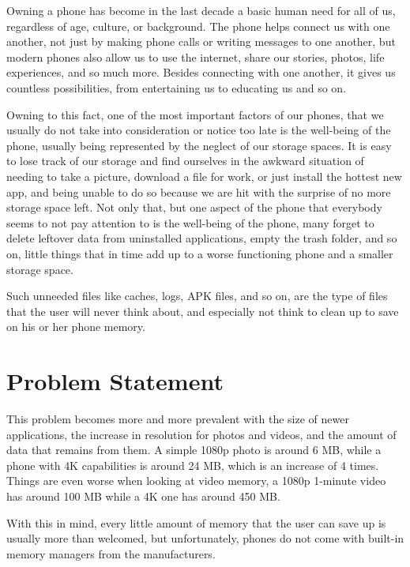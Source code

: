 Owning a phone has become in the last decade a basic human need for all of us, regardless of age, culture, or background. The phone helps connect us with one another, not just by making phone calls or writing messages to one another, but modern phones also allow us to use the internet, share our stories, photos, life experiences, and so much more. Besides connecting with one another, it gives us countless possibilities, from entertaining us to educating us and so on. 

Owning to this fact, one of the most important factors of our phones, that we usually do not take into consideration or notice too late is the well-being of the phone, usually being represented by the neglect of our storage spaces. It is easy to lose track of our storage and find ourselves in the awkward situation of needing to take a picture, download a file for work, or just install the hottest new app, and being unable to do so because we are hit with the surprise of no more storage space left. Not only that, but one aspect of the phone that everybody seems to not pay attention to is the well-being of the phone, many forget to delete leftover data from uninstalled applications, empty the trash folder, and so on, little things that in time add up to a worse functioning phone and a smaller storage space.

Such unneeded files like caches, logs, \ac{APK} files, and so on, are the type of files that the user will never think about, and especially not think to clean up to save on his or her phone memory.

\section{Problem Statement}\label{sect:Problem Statement}

This problem becomes more and more prevalent with the size of newer applications, the increase in resolution for photos and videos, and the amount of data that remains from them. A simple 1080\ac{p} photo is around 6 \ac{MB}, while a phone with \ac{4K} capabilities is around 24 \ac{MB}, which is an increase of 4 times. Things are even worse when looking at video memory, a 1080\ac{p} 1-minute video has around 100 \ac{MB} while a \ac{4K} one has around 450 \ac{MB}.

With this in mind, every little amount of memory that the user can save up is usually more than welcomed, but unfortunately, phones do not come with built-in memory managers from the manufacturers.

